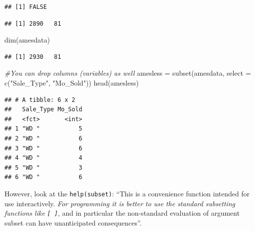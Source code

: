 \documentclass[
]{book}
\newenvironment{Shaded}{\begin{snugshade}}{\end{snugshade}}
\newcommand{\AttributeTok}[1]{\textcolor[rgb]{0.77,0.63,0.00}{#1}}
\newcommand{\CommentTok}[1]{\textcolor[rgb]{0.56,0.35,0.01}{\textit{#1}}}
\newcommand{\FunctionTok}[1]{\textcolor[rgb]{0.00,0.00,0.00}{#1}}
\newcommand{\NormalTok}[1]{#1}
\newcommand{\OtherTok}[1]{\textcolor[rgb]{0.56,0.35,0.01}{#1}}
\newcommand{\SpecialCharTok}[1]{\textcolor[rgb]{0.00,0.00,0.00}{#1}}
\newcommand{\StringTok}[1]{\textcolor[rgb]{0.31,0.60,0.02}{#1}}
\begin{document}
\begin{verbatim}
## [1] FALSE
\end{verbatim}

\begin{Shaded}
\end{Shaded}

\begin{verbatim}
## [1] 2890   81
\end{verbatim}

\begin{Shaded}
\begin{Highlighting}[]
\FunctionTok{dim}\NormalTok{(amesdata)}
\end{Highlighting}
\end{Shaded}

\begin{verbatim}
## [1] 2930   81
\end{verbatim}

\begin{Shaded}
\begin{Highlighting}[]
\CommentTok{\#You can drop columns (variables) as well}
\NormalTok{amesless }\OtherTok{=} \FunctionTok{subset}\NormalTok{(amesdata, }\AttributeTok{select =} \FunctionTok{c}\NormalTok{(}\StringTok{"Sale\_Type"}\NormalTok{, }\StringTok{"Mo\_Sold"}\NormalTok{))}
\FunctionTok{head}\NormalTok{(amesless)}
\end{Highlighting}
\end{Shaded}

\begin{verbatim}
## # A tibble: 6 x 2
##   Sale_Type Mo_Sold
##   <fct>       <int>
## 1 "WD "           5
## 2 "WD "           6
## 3 "WD "           6
## 4 "WD "           4
## 5 "WD "           3
## 6 "WD "           6
\end{verbatim}

However, look at the \texttt{help(subset)}: ``This is a convenience function intended for use interactively. \emph{For programming it is better to use the standard subsetting functions like \texttt{{[}\ {]}}}, and in particular the non-standard evaluation of argument subset can have unanticipated consequences''.
\end{document}
